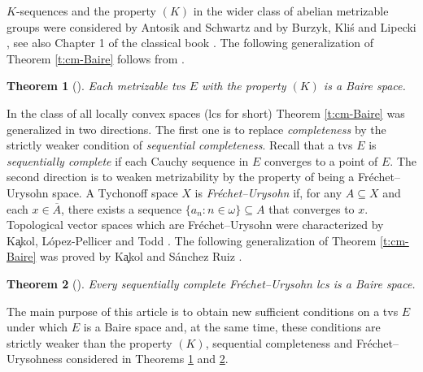 \documentclass[preprint,11pt]{elsarticle}
\newtheorem{theorem}{Theorem}[section]
\theoremstyle{definition}
\theoremstyle{remark}
\numberwithin{equation}{section}
\numberwithin{theorem}{section}
\newcommand{\w}{\omega}
\begin{document}
$K$-sequences and the property $(K)$ in the wider class of abelian metrizable groups were considered by  Antosik and Schwartz \cite{AntosikSchwartz1985} and by Burzyk,  Kli\'{s} and Lipecki \cite{BurzykLipecki1984}, see also Chapter 1 of the classical book  \cite{PB}. The following generalization of Theorem \ref{t:cm-Baire} follows from \cite[Theorem~2]{BurzykLipecki1984}.


\begin{theorem}[\cite{BurzykLipecki1984}] \label{t:m-K-Baire}
Each metrizable tvs $E$ with the property $(K)$ is a Baire space.
\end{theorem}

In the class of all locally convex spaces (lcs for short) Theorem \ref{t:cm-Baire} was generalized in two directions. The first one is to replace {\em completeness} by the strictly weaker condition of {\em sequential completeness}. Recall that a tvs $E$ is {\em sequentially complete} if each Cauchy sequence in $E$ converges to a point of $E$. The second direction is to weaken metrizability by the property of being a Fr\'{e}chet--Urysohn space. A Tychonoff space $X$ is {\em Fr\'{e}chet--Urysohn} if, for any $A\subseteq X$ and each $x\in \overline{A}$, there exists a sequence $\{a_n: n\in \w\}\subseteq A$ that converges to $x$. Topological vector spaces  which are Fr\'{e}chet--Urysohn were characterized by K\c{a}kol, L\'{o}pez-Pellicer and Todd \cite[Theorem~1]{KPLT}. The following generalization of Theorem \ref{t:cm-Baire} was proved by K\c{a}kol and S\'{a}nchez Ruiz \cite{KSR}.

\begin{theorem}[\cite{KSR}] \label{t:sc+FU=>Baire}
Every sequentially complete Fr\'{e}chet--Urysohn lcs is a Baire space.
\end{theorem}


The main purpose of this article is to obtain new sufficient conditions on a tvs $E$ under which $E$ is a Baire space and, at the same time, these conditions are strictly weaker than the property $(K)$, sequential completeness and Fr\'{e}chet--Urysohness considered in Theorems \ref{t:m-K-Baire} and \ref{t:sc+FU=>Baire}.


%
%
%
\end{document}
